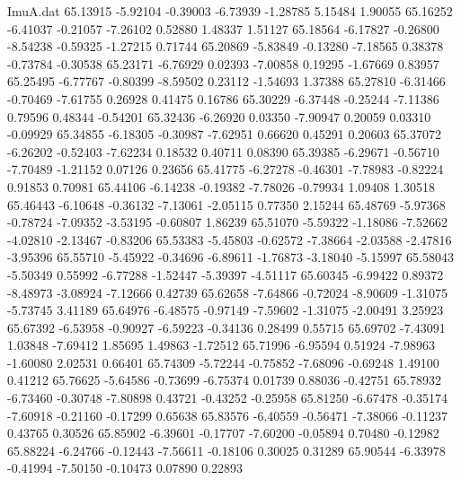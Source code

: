 \begin{filecontents}{ImuA.dat}
  65.13915   -5.92104   -0.39003   -6.73939   -1.28785    5.15484    1.90055
  65.16252   -6.41037   -0.21057   -7.26102    0.52880    1.48337    1.51127
  65.18564   -6.17827   -0.26800   -8.54238   -0.59325   -1.27215    0.71744
  65.20869   -5.83849   -0.13280   -7.18565    0.38378   -0.73784   -0.30538
  65.23171   -6.76929    0.02393   -7.00858    0.19295   -1.67669    0.83957
  65.25495   -6.77767   -0.80399   -8.59502    0.23112   -1.54693    1.37388
  65.27810   -6.31466   -0.70469   -7.61755    0.26928    0.41475    0.16786
  65.30229   -6.37448   -0.25244   -7.11386    0.79596    0.48344   -0.54201
  65.32436   -6.26920    0.03350   -7.90947    0.20059    0.03310   -0.09929
  65.34855   -6.18305   -0.30987   -7.62951    0.66620    0.45291    0.20603
  65.37072   -6.26202   -0.52403   -7.62234    0.18532    0.40711    0.08390
  65.39385   -6.29671   -0.56710   -7.70489   -1.21152    0.07126    0.23656
  65.41775   -6.27278   -0.46301   -7.78983   -0.82224    0.91853    0.70981
  65.44106   -6.14238   -0.19382   -7.78026   -0.79934    1.09408    1.30518
  65.46443   -6.10648   -0.36132   -7.13061   -2.05115    0.77350    2.15244
  65.48769   -5.97368   -0.78724   -7.09352   -3.53195   -0.60807    1.86239
  65.51070   -5.59322   -1.18086   -7.52662   -4.02810   -2.13467   -0.83206
  65.53383   -5.45803   -0.62572   -7.38664   -2.03588   -2.47816   -3.95396
  65.55710   -5.45922   -0.34696   -6.89611   -1.76873   -3.18040   -5.15997
  65.58043   -5.50349    0.55992   -6.77288   -1.52447   -5.39397   -4.51117
  65.60345   -6.99422    0.89372   -8.48973   -3.08924   -7.12666    0.42739
  65.62658   -7.64866   -0.72024   -8.90609   -1.31075   -5.73745    3.41189
  65.64976   -6.48575   -0.97149   -7.59602   -1.31075   -2.00491    3.25923
  65.67392   -6.53958   -0.90927   -6.59223   -0.34136    0.28499    0.55715
  65.69702   -7.43091    1.03848   -7.69412    1.85695    1.49863   -1.72512
  65.71996   -6.95594    0.51924   -7.98963   -1.60080    2.02531    0.66401
  65.74309   -5.72244   -0.75852   -7.68096   -0.69248    1.49100    0.41212
  65.76625   -5.64586   -0.73699   -6.75374    0.01739    0.88036   -0.42751
  65.78932   -6.73460   -0.30748   -7.80898    0.43721   -0.43252   -0.25958
  65.81250   -6.67478   -0.35174   -7.60918   -0.21160   -0.17299    0.65638
  65.83576   -6.40559   -0.56471   -7.38066   -0.11237    0.43765    0.30526
  65.85902   -6.39601   -0.17707   -7.60200   -0.05894    0.70480   -0.12982
  65.88224   -6.24766   -0.12443   -7.56611   -0.18106    0.30025    0.31289
  65.90544   -6.33978   -0.41994   -7.50150   -0.10473    0.07890    0.22893

\end{filecontents}
